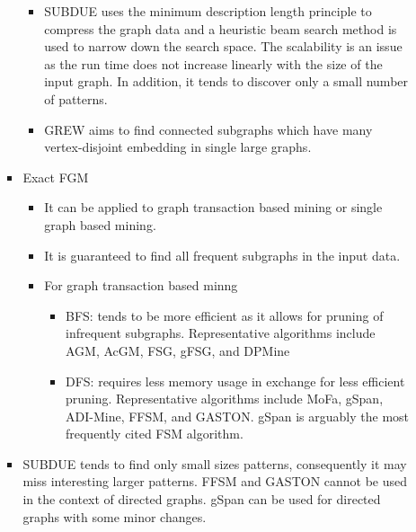 \documentclass[14pt]{article}
\begin{document}
\begin{enumerate}
\begin{itemize}
\begin{itemize}
      \begin{itemize}
       \item SUBDUE uses the minimum description length principle to compress the graph data and a heuristic beam search method is used to narrow down the search space. The scalability is an issue as the run time does not increase linearly with the size of the input graph. In addition, it tends to discover only a small number of patterns.
       \item GREW aims to find connected subgraphs which have many vertex-disjoint embedding in single large graphs. 
      \end{itemize}
     \item Exact FGM
      \begin{itemize}
       \item It can be applied to graph transaction based mining or single graph based mining. 
       \item It is guaranteed to find all frequent subgraphs in the input data.
       \item For graph transaction based minng
        \begin{itemize}
         \item BFS: tends to be more efficient as it allows for pruning of infrequent subgraphs. Representative algorithms include AGM, AcGM, FSG, gFSG, and DPMine
         \item DFS: requires less memory usage in exchange for less efficient pruning. Representative algorithms include MoFa, gSpan, ADI-Mine, FFSM, and GASTON. gSpan is arguably the most frequently cited FSM algorithm.
        \end{itemize}
      \end{itemize}
     
     \item SUBDUE tends to find only small sizes patterns, consequently it may miss interesting larger patterns. FFSM and GASTON cannot be used in the context of directed graphs. gSpan can be used for directed graphs with some minor changes.
    \end{itemize}
  \end{itemize}   
\end{enumerate}
\end{document}
